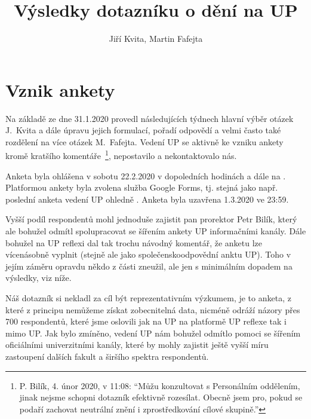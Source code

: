 \documentclass[a4paper,twoside]{article}
\author{Jiří Kvita, Martin Fafejta}
\title{Výsledky dotazníku o dění na UP}
\begin{document}
\maketitle

\tableofcontents
\newpage

\section{Vznik ankety}

Na základě  ze dne 31.1.2020 provedl následujících týdnech hlavní výběr otázek J.~Kvita a dále úpravu jejich formulací, pořadí odpovědí a velmi často také rozdělení na více otázek M.~Fafejta. Vedení UP se aktivně ke vzniku ankety kromě kratšího komentáře~\footnote{P. Bilík, 4. únor 2020, v 11:08: ``Můžu konzultovat s Personálním oddělením, jinak nejsme schopni dotazník efektivně rozesílat. Obecně jsem pro, pokud se podaří zachovat neutrální znění i zprostředkování cílové skupině.''}, nepostavilo a nekontaktovalo nás.

Anketa byla ohlášena v sobotu 22.2.2020  v dopoledních hodinách  a dále na . Platformou ankety byla zvolena služba Google Forms, tj. stejná jako např. poslední anketa vedení UP ohledně . Anketa byla uzavřena 1.3.2020 ve 23:59.

Vyšší podíl respondentů mohl jednoduše zajistit pan prorektor Petr Bilík, který ale bohužel odmítl spolupracovat se šířením ankety UP informačními kanály. Dále bohužel na UP reflexi dal tak trochu návodný komentář, že anketu lze vícenásobně vyplnit (stejně ale jako společenskoodpovědní anktu UP). Toho v jejím záměru opravdu někdo z části zneužil, ale jen s minimálním dopadem na výsledky, viz níže.

Náš dotazník si nekladl za cíl být reprezentativním výzkumem, je to anketa, z které z principu nemůžeme získat zobecnitelná data, nicméně odráží názory přes 700 respondentů, které jsme oslovili jak na UP na platformě UP reflexe tak i mimo UP. Jak bylo zmíněno, vedení UP nám bohužel odmítlo pomoci se šířením oficiálními univerzitními kanály, které by mohly zajistit ještě vyšší míru zastoupení dalších fakult a širšího spektra respondentů.
\end{document}
